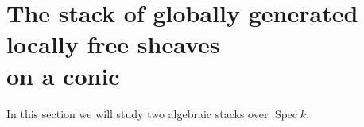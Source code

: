 \documentclass{amsart}
\numberwithin{equation}{section}
\numberwithin{subsection}{section}
\theoremstyle{definition}
\theoremstyle{remark}
\newcommand\refall[2]{\ref{#1}~(\ref{#1;#2})}
\newcommand\cO{\mathcal{O}} \newcommand\cP{\mathcal{P}}
\renewcommand\AA{\mathbb{A}} \newcommand\BB{\mathbb{B}}
\newcommand\spec{\operatorname{Spec}}
\newcommand{\underhom}
{\mathop{\underline{\mathrm{Hom}}}\nolimits}
\newcommand{\sym}{\operatorname{Sym}}
\newcommand{\dual}{^{\vee}}
\begin{document}




\section{The stack of globally generated locally free sheaves\\on a conic}\label{sec:glgen-conic}

In this section we will study two algebraic stacks over $\spec k$.
\end{document}
